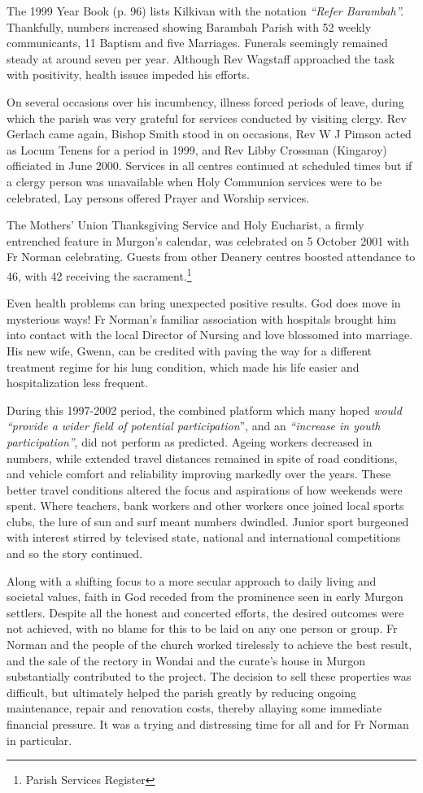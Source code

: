 The 1999 Year Book (p. 96) lists Kilkivan with the notation \emph{``Refer Barambah''.} Thankfully, numbers increased showing Barambah Parish with 52 weekly communicants, 11 Baptism and five Marriages. Funerals seemingly remained steady at around seven per year. Although Rev Wagstaff approached the task with positivity, health issues impeded his efforts.

On several occasions over his incumbency, illness forced periods of leave, during which the parish was very grateful for services conducted by visiting clergy. Rev Gerlach came again, Bishop Smith stood in on occasions, Rev W J Pimson acted as Locum Tenens for a period in 1999, and Rev Libby Crossman (Kingaroy) officiated in June 2000. Services in all centres continued at scheduled times but if a clergy person was unavailable when Holy Communion services were to be celebrated, Lay persons offered Prayer and Worship services.

The Mothers' Union Thanksgiving Service and Holy Eucharist, a firmly entrenched feature in Murgon's calendar, was celebrated on 5 October 2001 with Fr Norman celebrating. Guests from other Deanery centres boosted attendance to 46, with 42 receiving the sacrament.\footnote{Parish Services Register}

Even health problems can bring unexpected positive results. God does move in mysterious ways! Fr Norman's familiar association with hospitals brought him into contact with the local Director of Nursing and love blossomed into marriage. His new wife, Gwenn, can be credited with paving the way for a different treatment regime for his lung condition, which made his life easier and hospitalization less frequent.

During this 1997-2002 period, the combined platform which many hoped \emph{would ``provide a wider field of potential participation}'', and an \emph{``increase in youth participation''}, did not perform as predicted. Ageing workers decreased in numbers, while extended travel distances remained in spite of road conditions, and vehicle comfort and reliability improving markedly over the years. These better travel conditions altered the focus and aspirations of how weekends were spent. Where teachers, bank workers and other workers once joined local sports clubs, the lure of sun and surf meant numbers dwindled. Junior sport burgeoned with interest stirred by televised state, national and international competitions and so the story continued.

Along with a shifting focus to a more secular approach to daily living and societal values, faith in God receded from the prominence seen in early Murgon settlers. Despite all the honest and concerted efforts, the desired outcomes were not achieved, with no blame for this to be laid on any one person or group. Fr Norman and the people of the church worked tirelessly to achieve the best result, and the sale of the rectory in Wondai and the curate's house in Murgon substantially contributed to the project. The decision to sell these properties was difficult, but ultimately helped the parish greatly by reducing ongoing maintenance, repair and renovation costs, thereby allaying some immediate financial pressure. It was a trying and distressing time for all and for Fr Norman in particular.

